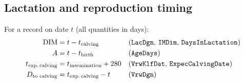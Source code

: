 \documentclass[10pt,a4paper]{article}
\begin{document}
\subsection{Lactation and reproduction timing}
For a record on date $t$ (all quantities in days):
\begin{align}
  \mathrm{DIM}           &= t - t_{\text{calving}}
      && \text{(\texttt{LacDgn}, \texttt{IMDim}, \texttt{DaysInLactation})} \label{eq:dim}\\
  A                      &= t - t_{\text{birth}}
      && \text{(\texttt{AgeDays})} \label{eq:age}\\
  t_{\text{exp.\,calving}} &= t_{\text{insemination}} + 280
      && \text{(\texttt{VrwKlfDat}, \texttt{ExpecCalvingDate})} \label{eq:expcalv}\\
  D_{\text{to calving}}  &= t_{\text{exp.\,calving}} - t
      && \text{(\texttt{VrwDgn})} \label{eq:vrwdgn}
\end{align}
\end{document}
